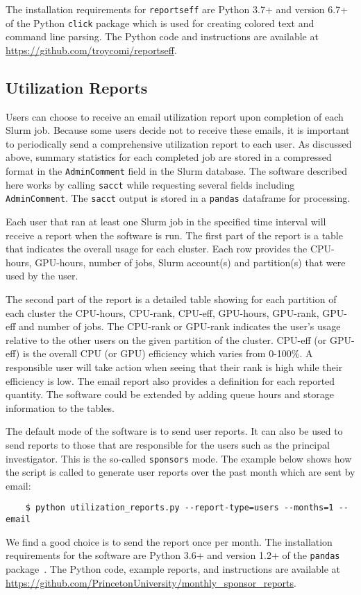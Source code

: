 The installation requirements for \texttt{reportseff} are Python 3.7+ and version 6.7+ of the Python \texttt{click} package which is used for creating colored text and command line parsing. The Python code and instructions are available at \url{https://github.com/troycomi/reportseff}.



\subsection{Utilization Reports}
Users can choose to receive an email utilization report upon completion of each Slurm job. Because some users decide not to receive these emails, it is important to periodically send a comprehensive utilization report to each user. As discussed above, summary statistics for each completed job are stored in a compressed format in the \texttt{AdminComment} field in the Slurm database. The software described here works by calling \texttt{sacct} while requesting several fields including \texttt{AdminComment}. The \texttt{sacct} output is stored in a \texttt{pandas} dataframe for processing.

Each user that ran at least one Slurm job in the specified time interval will receive a report when the software is run. The first part of the report is a table that indicates the overall usage for each cluster. Each row provides the CPU-hours, GPU-hours, number of jobs, Slurm account(s) and partition(s) that were used by the user.

The second part of the report is a detailed table showing for each partition of each cluster the CPU-hours, CPU-rank, CPU-eff, GPU-hours, GPU-rank, GPU-eff and number of jobs. The CPU-rank or GPU-rank indicates the user's usage relative to the other users on the given partition of the cluster. CPU-eff (or GPU-eff) is the overall CPU (or GPU) efficiency which varies from 0-100\%. A responsible user will take action when seeing that their rank is high while their efficiency is low. The email report also provides a definition for each reported quantity. The software could be extended by adding queue hours and storage information to the tables.

The default mode of the software is to send user reports. It can also be used to send reports to those that are responsible for the users such as the principal investigator. This is the so-called \texttt{sponsors} mode. The example below shows how the script is called to generate user reports over the past month which are sent by email:

\begin{verbatim}
    $ python utilization_reports.py --report-type=users --months=1 --email
\end{verbatim}

We find a good choice is to send the report once per month. The installation requirements for the software are Python 3.6+ and version 1.2+ of the \texttt{pandas} package~\cite{reback2020pandas}. The Python code, example reports, and instructions are available at \url{https://github.com/PrincetonUniversity/monthly_sponsor_reports}.
